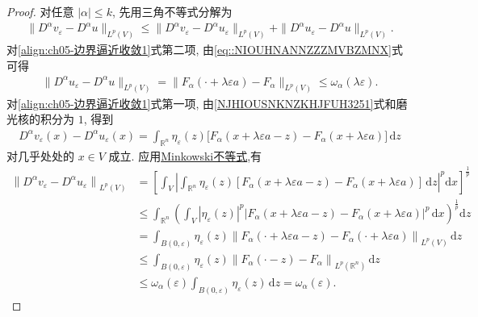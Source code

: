 \documentclass[../../main.tex]{subfiles}
\begin{document}
\begin{proof}
对任意 $|\alpha|\leqslant k$, 先用三角不等式分解为
\begin{align}
\|D^{\alpha}v_{\varepsilon}-D^{\alpha}u\|_{L^{p}(V)}
\leqslant
\|D^{\alpha}v_{\varepsilon}
-D^{\alpha}u_{\varepsilon}\|_{L^{p}(V)}
+
\|D^{\alpha}u_{\varepsilon}
-D^{\alpha}u\|_{L^{p}(V)}.
\label{align:ch05-边界逼近收敛1}
\end{align}
对\eqref{align:ch05-边界逼近收敛1}式第二项, 由\eqref{eq::NIOUHNANNZZZMVBZMNX}式可得
\begin{align}\label{eqJIOJFIOIWIOURIOWORWPPPPP223}
\|D^{\alpha}u_{\varepsilon}-D^{\alpha}u\|_{L^{p}(V)}
=
\|F_{\alpha}(\cdot+\lambda\varepsilon a)
-F_{\alpha}\|_{L^{p}(V)}\leqslant\omega_{\alpha}(\lambda\varepsilon).
\end{align}
对\eqref{align:ch05-边界逼近收敛1}式第一项, 由\eqref{NJHIOUSNKNZKHJFUH3251}式和磨光核的积分为 $1$, 得到
\begin{align*}
D^{\alpha}v_{\varepsilon}(x)
-D^{\alpha}u_{\varepsilon}(x)
=
\int_{\mathbb{R}^{n}}\eta_{\varepsilon}(z)
\bigl[
F_{\alpha}(x+\lambda\varepsilon a-z)
-F_{\alpha}(x+\lambda\varepsilon a)
\bigr]\,\mathrm{d}z
\end{align*}
对几乎处处的 $x\in V$ 成立. 应用\hyperref[Basis of Analytics-theorem:Minkowski(闵可夫斯基)不等式]{Minkowski不等式},有
\begin{align*}
\left\| D^{\alpha}v_{\varepsilon}-D^{\alpha}u_{\varepsilon} \right\| _{L^p(V)}&=\left[ \int_V{\left| \int_{\mathbb{R} ^n}{\eta _{\varepsilon}\left( z \right) \left[ F_{\alpha}\left( x+\lambda \varepsilon a-z \right) -F_{\alpha}\left( x+\lambda \varepsilon a \right) \right] \,\mathrm{d}z} \right|^p\mathrm{d}x} \right] ^{\frac{1}{p}}
\\
&\leqslant \int_{\mathbb{R} ^n}{\left( \int_V{\left| \eta _{\varepsilon}\left( z \right) \right|^p\left| F_{\alpha}\left( x+\lambda \varepsilon a-z \right) -F_{\alpha}\left( x+\lambda \varepsilon a \right) \right|^p\,\mathrm{d}x} \right) ^{\frac{1}{p}}\mathrm{d}z}
\\
&=\int_{B\left( 0,\varepsilon \right)}{\eta _{\varepsilon}\left( z \right) \left\| F_{\alpha}\left( \cdot +\lambda \varepsilon a-z \right) -F_{\alpha}\left( \cdot +\lambda \varepsilon a \right) \right\| _{L^p\left( V \right)}\,\mathrm{d}z}
\\
&\leqslant \int_{B\left( 0,\varepsilon \right)}{\eta _{\varepsilon}(z)\left\| F_{\alpha}\left( \cdot -z \right) -F_{\alpha} \right\| _{L^p(\mathbb{R} ^n)}\,\mathrm{d}z}
\\
&\leqslant \omega _{\alpha}\left( \varepsilon \right) \int_{B\left( 0,\varepsilon \right)}{\eta _{\varepsilon}(z)\,\mathrm{d}z}=\omega _{\alpha}\left( \varepsilon \right) .

\end{align*}
\end{proof}
\end{document}
